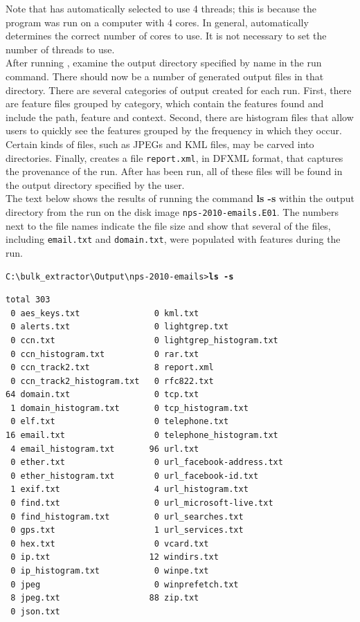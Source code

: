 \documentclass[11pt]{article} %
\begin{document}
Note that \bulk has automatically selected to use 4 threads; this is because the program was run on a computer with 4 cores. In general, \bulk automatically determines the correct number of cores to use. It is not necessary to set the number of threads to use.\\

After running \bulk, examine the output directory specified by name in the run command. There should now be a number of generated output files in that directory. There are several categories of output created for each \bulk run. First, there are feature files grouped by category, which contain the features found and include the path, feature and context. Second, there are histogram files that allow users to quickly see the features grouped by the frequency in which they occur. Certain kinds of files, such as JPEGs and KML files, may be carved into directories. Finally, \bulk creates a file \texttt{report.xml}, in DFXML format, that captures the provenance of the run. After \bulk has been run, all of these files will be found in the output directory specified by the user.\\

The text below shows the results of running the command \textbf{ls -s} within the output directory from the \bulk run on the disk image \texttt{nps-2010-emails.E01}. The numbers next to the file names indicate the file size and show that several of the files, including \texttt{email.txt} and \texttt{domain.txt}, were populated with features during the run.

\begingroup
\footnotesize
\texttt{C:\textbackslash bulk\_extractor\textbackslash Output\textbackslash nps-2010-emails\textgreater \textbf{ls -s}}
\endgroup
\begingroup
\footnotesize
\begin{Verbatim}[fontfamily=courier]
total 303
 0 aes_keys.txt               0 kml.txt
 0 alerts.txt                 0 lightgrep.txt
 0 ccn.txt                    0 lightgrep_histogram.txt
 0 ccn_histogram.txt          0 rar.txt
 0 ccn_track2.txt             8 report.xml
 0 ccn_track2_histogram.txt   0 rfc822.txt
64 domain.txt                 0 tcp.txt
 1 domain_histogram.txt       0 tcp_histogram.txt
 0 elf.txt                    0 telephone.txt
16 email.txt                  0 telephone_histogram.txt
 4 email_histogram.txt       96 url.txt
 0 ether.txt                  0 url_facebook-address.txt
 0 ether_histogram.txt        0 url_facebook-id.txt
 1 exif.txt                   4 url_histogram.txt
 0 find.txt                   0 url_microsoft-live.txt
 0 find_histogram.txt         0 url_searches.txt
 0 gps.txt                    1 url_services.txt
 0 hex.txt                    0 vcard.txt
 0 ip.txt                    12 windirs.txt
 0 ip_histogram.txt           0 winpe.txt
 0 jpeg                       0 winprefetch.txt
 8 jpeg.txt                  88 zip.txt
 0 json.txt
\end{Verbatim}
\endgroup
\end{document}
